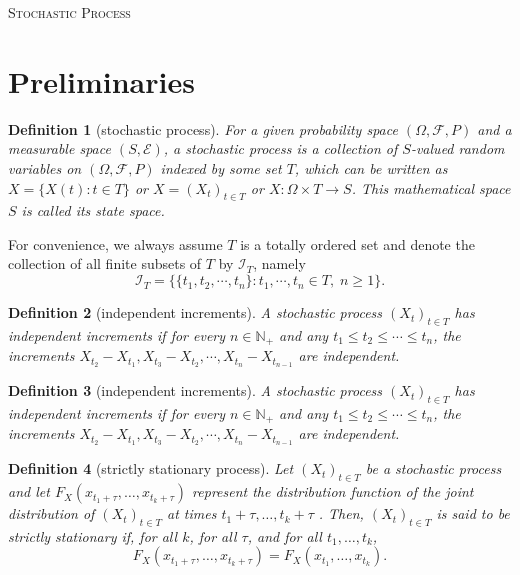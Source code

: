 \documentclass{article}
\newtheorem{definition}{Definition}[section]
\theoremstyle{nonumberplain}
\begin{document}
	\begin{center}
	\textsc{\Huge Stochastic Process}	
\end{center}
\vspace{1em} 

\section{Preliminaries}
\begin{definition}[stochastic process]
For a given probability space $(\Omega ,{\mathcal{F}},P)$ and a measurable space $(S,\mathcal{E})$, a \emph{stochastic process} is a collection of $S$-valued random variables on $(\Omega ,{\mathcal{F}},P)$ indexed by some set $T$, which can be written as $X=\{X(t):t\in T\}$ or $X=(X_t)_{t\in T}$ or $X:\Omega \times T\rightarrow S$. This mathematical space $S$ is called its state space. 
\end{definition}

\noindent For convenience, we always assume $T$ is a totally ordered set and denote the collection of all finite subsets of $T$ by $\mathcal{I}_T$, namely
\[
\mathcal{I}_T=\{\{t_1,t_2,\cdots,t_n\}:t_1,\cdots,t_n\in T,\;n\ge 1\}.
\]

\begin{definition}[independent increments]
	A stochastic process $(X_t)_{t\in T}$ has \emph{independent increments} if for every $n\in \mathbb{N}_+$ and any $t_1\le t_2 \le\cdots\le t_n$, the increments $X_{t_2}-X_{t_1},X_{t_3}-X_{t_2},\cdots,X_{t_n}-X_{t_{n-1}}$ are independent.
\end{definition}

\begin{definition}[independent increments]
  A stochastic process $(X_t)_{t\in T}$ has \emph{independent increments} if for every $n\in \mathbb{N}_+$ and any $t_1\le t_2 \le\cdots\le t_n$, the increments $X_{t_2}-X_{t_1},X_{t_3}-X_{t_2},\cdots,X_{t_n}-X_{t_{n-1}}$ are independent.
\end{definition}


\begin{definition}[strictly stationary process]
	Let $(X_t)_{t\in T}$ be a stochastic process and let \newline $F_{{X}}(x_{{t_{1}+\tau }},\ldots ,x_{{t_{k}+\tau }})$ represent the  distribution function of the joint distribution of $(X_t)_{t\in T}$ at times $t_{1}+\tau ,\ldots ,t_{k}+\tau$ . Then, $(X_t)_{t\in T}$ is said to be strictly stationary if, for all $k$, for all $\tau$, and for all $ t_{1},\ldots ,t_{k}$,
	\[
	F_{{X}}(x_{{t_{1}+\tau }},\ldots ,x_{{t_{k}+\tau }})=F_{{X}}(x_{{t_{1}}},\ldots ,x_{{t_{k}}}).
	\]
\end{definition}
\end{document}
